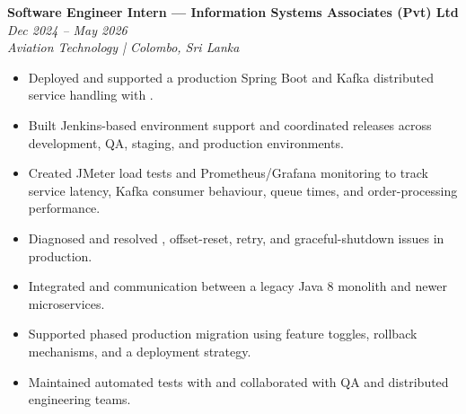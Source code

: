 \noindent
\textbf{Software Engineer Intern --- Information Systems Associates (Pvt) Ltd} \hfill \textit{Dec 2024 -- May 2026}\\
\noindent
\textit{Aviation Technology | Colombo, Sri Lanka}\\[0.05em]

\begin{itemize}[leftmargin=*, itemsep=0.3em, topsep=0.01em]
    \item Deployed and supported a production Spring Boot and Kafka distributed service handling  with .
    \item Built Jenkins-based environment support and coordinated releases across development, QA, staging, and production environments.
    \item Created JMeter load tests and Prometheus/Grafana monitoring to track service latency, Kafka consumer behaviour, queue times, and order-processing performance.
    \item Diagnosed and resolved , offset-reset, retry, and graceful-shutdown issues in production.
    \item Integrated  and  communication between a legacy Java 8 monolith and newer microservices.
    \item Supported phased production migration using feature toggles, rollback mechanisms, and a  deployment strategy.
    \item Maintained automated tests with  and collaborated with QA and distributed engineering teams.
\end{itemize}
